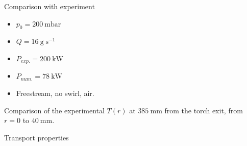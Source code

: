 \documentclass[24pt,t,table, aspectratio=169]{beamer}
\begin{document}
\begin{frame}{Comparison with experiment}

\centering
\begin{minipage}{.7\linewidth}

\end{minipage}
\begin{minipage}{.29\linewidth}
\begin{itemize}
\item $p_0 = \SI{200}{\milli\bar}$
\item $Q = \SI{16}{\gram\;\second^{-1}}$ 
\item $P_{exp.} = \SI{200}{\kilo\watt}$
\item $P_{num.} = \SI{78}{\kilo\watt}$
\item Freestream, no swirl, air.
\end{itemize}
\end{minipage}

\centering
Comparison of the experimental $T(r)$ at $\SI{385}{\milli\meter}$ from the torch exit, from $r = 0$ to $\SI{40}{\milli\meter}$.

\end{frame}


\begin{frame}{Transport properties}
\centering
{}
\only<2>{
\begin{minipage}{.49\linewidth}

\end{minipage}
}
\begin{minipage}{0.49\linewidth}

\end{minipage}

\end{frame}
\end{document}
